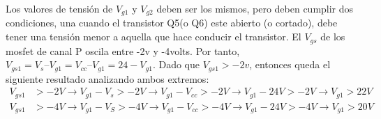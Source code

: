 Los valores de tensión de $V_{g1}$ y $V_{g2}$ deben ser los mismos, pero deben cumplir dos condiciones, una cuando el transistor Q5(o Q6) este abierto (o cortado), debe tener una tensión menor a aquella que hace conducir el transistor. El $V_{gs}$ de los mosfet de canal P oscila entre -2v y -4volts. Por tanto, $V_{gs1} = V_{s} – V_{g1} = V_{cc} – V_{g1} = 24 -V_{g1}$. Dado  que $V_{gs1}>-2v $, entonces  queda el siguiente resultado analizando ambos extremos: 
\hspace{-10mm}
\begin{align} 
		V_{gs1} &>-2V \rightarrow V_{g1} - V_s>-2V  \rightarrow V_{g1} - V_{cc}>-2V\rightarrow V_{g1}-24V>-2V \rightarrow V_{g1}>22V \label{eq:margen_inf_mos} \\ 
 		V_{gs1} &>-4V \rightarrow V_{g1} - V_S>  -4V \rightarrow V_{g1} - V_{cc}> -4V \rightarrow V_{g1} - 24V>-4V \rightarrow V_{g1}>20V  
\end{align}
 
